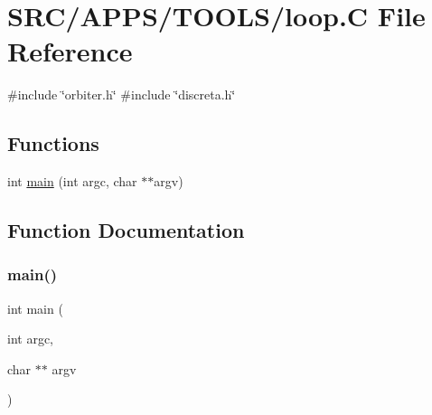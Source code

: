 \hypertarget{loop_8_c}{}\section{S\+R\+C/\+A\+P\+P\+S/\+T\+O\+O\+L\+S/loop.C File Reference}
\label{loop_8_c}
{\ttfamily \#include \char`\"{}orbiter.\+h\char`\"{}}\newline
{\ttfamily \#include \char`\"{}discreta.\+h\char`\"{}}\newline
\subsection*{Functions}
\begin{DoxyCompactItemize}
\item 
int \mbox{\hyperlink{loop_8_c_a3c04138a5bfe5d72780bb7e82a18e627}{main}} (int argc, char $\ast$$\ast$argv)
\end{DoxyCompactItemize}


\subsection{Function Documentation}
\mbox{\label{loop_8_c_a3c04138a5bfe5d72780bb7e82a18e627}} 
\subsubsection{\texorpdfstring{main()}{main()}}
{\footnotesize\ttfamily int main (\begin{DoxyParamCaption}\item[{int}]{argc,  }\item[{char $\ast$$\ast$}]{argv }\end{DoxyParamCaption})}

